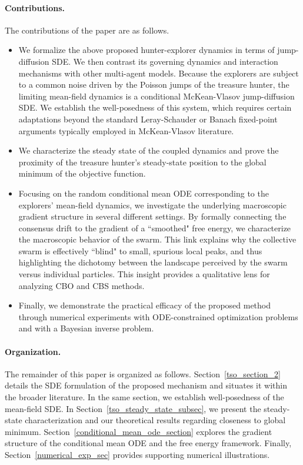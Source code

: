 \documentclass{article}
\numberwithin{equation}{section}
\begin{document}
\paragraph{Contributions.} The contributions of the paper are as follows.
\begin{itemize}
\item[(i)] We formalize the above proposed hunter-explorer dynamics in terms of jump-diffusion SDE. We then contrast its governing dynamics and interaction mechanisms with other multi-agent models.
 Because the explorers are subject to a common noise driven by the Poisson jumps of the treasure hunter, the limiting mean-field dynamics is a conditional McKean-Vlasov jump-diffusion SDE. We establish the well-posedness of this system, which requires certain adaptations beyond the standard Leray-Schauder or Banach fixed-point arguments typically employed in McKean-Vlasov literature.

 \item[(ii)] We characterize the steady state of the coupled dynamics and prove the proximity of the treasure hunter's steady-state position to the global minimum of the objective function.


\item[(iii)] Focusing on the random conditional mean ODE corresponding to the explorers' mean-field dynamics, we investigate the underlying macroscopic gradient structure in several different settings. By formally connecting the consensus drift to the gradient of a ``smoothed" free energy, we characterize the macroscopic behavior of the swarm. This link explains why the collective swarm is effectively  ``blind" to small, spurious local peaks, and thus highlighting the dichotomy between the landscape perceived by the swarm versus individual particles. This insight provides a qualitative lens for analyzing CBO and CBS methods.

\item[(iv)] Finally, we demonstrate the practical efficacy of the proposed method through numerical experiments with ODE-constrained optimization problems and with a Bayesian inverse problem.
\end{itemize}


\paragraph{Organization.}
The remainder of this paper is organized as follows. Section~\ref{tso_section_2} details the SDE formulation of the proposed mechanism and situates it within the broader literature. In the same section, we establish well-posedness of the mean-field SDE. In Section~\ref{tso_steady_state_subsec}, we present the steady-state characterization and our theoretical results regarding closeness to global minimum. Section~\ref{conditional_mean_ode_section} explores the gradient structure of the conditional mean ODE and the free energy framework. Finally, Section~\ref{numerical_exp_sec} provides supporting numerical illustrations.
\end{document}
